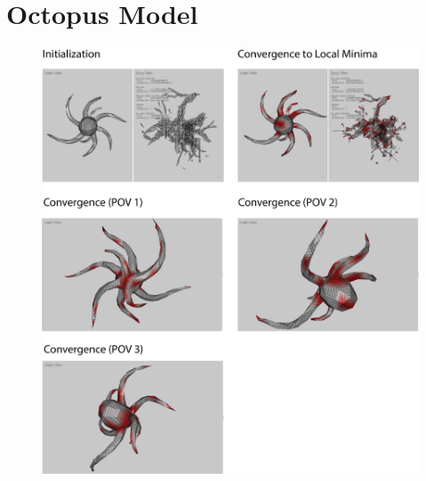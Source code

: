 \section{Octopus Model}
\begin{figure}[ht]
\centering
\includegraphics[width=14cm]{figures/results/octopus.png}
\caption[Octopus Model]{}
\end{figure}
\newpage
